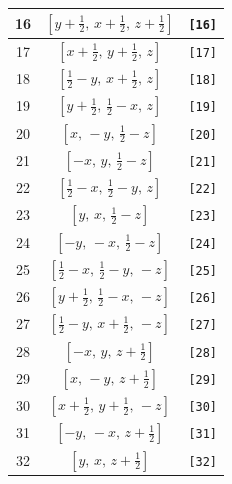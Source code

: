 \documentclass[fleqn,8pt]{jsarticle}
\begin{document}
\begin{longtable}{ccc}
16 & $\left[ y + \frac{1}{2},\, x + \frac{1}{2},\, z + \frac{1}{2} \right]$ & {\tt [16]} \\ \hline
17 & $\left[ x + \frac{1}{2},\, y + \frac{1}{2},\, z \right]$ & {\tt [17]} \\ \hline
18 & $\left[ \frac{1}{2} - y,\, x + \frac{1}{2},\, z \right]$ & {\tt [18]} \\ \hline
19 & $\left[ y + \frac{1}{2},\, \frac{1}{2} - x,\, z \right]$ & {\tt [19]} \\ \hline
20 & $\left[ x,\, - y,\, \frac{1}{2} - z \right]$ & {\tt [20]} \\ \hline
21 & $\left[ - x,\, y,\, \frac{1}{2} - z \right]$ & {\tt [21]} \\ \hline
22 & $\left[ \frac{1}{2} - x,\, \frac{1}{2} - y,\, z \right]$ & {\tt [22]} \\ \hline
23 & $\left[ y,\, x,\, \frac{1}{2} - z \right]$ & {\tt [23]} \\ \hline
24 & $\left[ - y,\, - x,\, \frac{1}{2} - z \right]$ & {\tt [24]} \\ \hline
25 & $\left[ \frac{1}{2} - x,\, \frac{1}{2} - y,\, - z \right]$ & {\tt [25]} \\ \hline
26 & $\left[ y + \frac{1}{2},\, \frac{1}{2} - x,\, - z \right]$ & {\tt [26]} \\ \hline
27 & $\left[ \frac{1}{2} - y,\, x + \frac{1}{2},\, - z \right]$ & {\tt [27]} \\ \hline
28 & $\left[ - x,\, y,\, z + \frac{1}{2} \right]$ & {\tt [28]} \\ \hline
29 & $\left[ x,\, - y,\, z + \frac{1}{2} \right]$ & {\tt [29]} \\ \hline
30 & $\left[ x + \frac{1}{2},\, y + \frac{1}{2},\, - z \right]$ & {\tt [30]} \\ \hline
31 & $\left[ - y,\, - x,\, z + \frac{1}{2} \right]$ & {\tt [31]} \\ \hline
32 & $\left[ y,\, x,\, z + \frac{1}{2} \right]$ & {\tt [32]} \\
\end{longtable}
\end{document}
